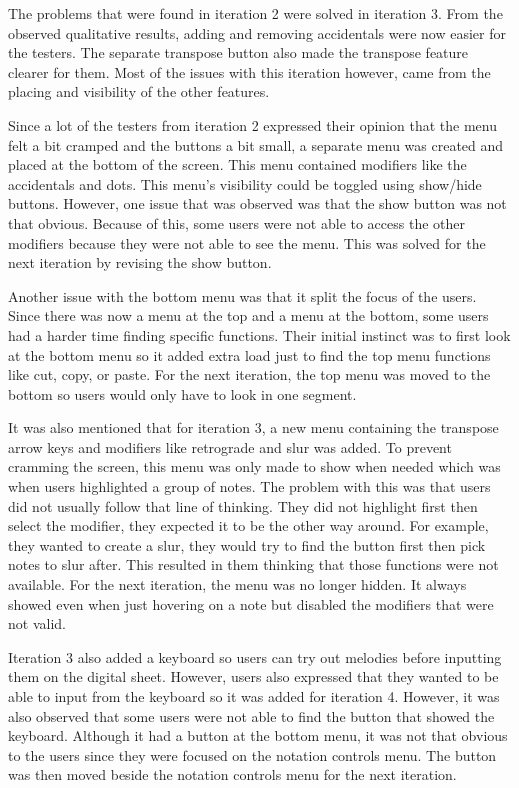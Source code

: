 			The problems that were found in iteration 2 were solved in iteration 3. From the observed qualitative results, adding and removing accidentals were now easier for the testers. The separate transpose button also made the transpose feature clearer for them. Most of the issues with this iteration however, came from the placing and visibility of the other features. 

			Since a lot of the testers from iteration 2 expressed their opinion that the menu felt a bit cramped and the buttons a bit small, a separate menu was created and placed at the bottom of the screen. This menu contained modifiers like the accidentals and dots. This menu's visibility could be toggled using show/hide buttons. However, one issue that was observed was that the show button was not that obvious. Because of this, some users were not able to access the other modifiers because they were not able to see the menu. This was solved for the next iteration by revising the show button. 

			Another issue with the bottom menu was that it split the focus of the users. Since there was now a menu at the top and a menu at the bottom, some users had a harder time finding specific functions. Their initial instinct was to first look at the bottom menu so it added extra load just to find the top menu functions like cut, copy, or paste. For the next iteration, the top menu was moved to the bottom so users would only have to look in one segment. 

			It was also mentioned that for iteration 3, a new menu containing the transpose arrow keys and modifiers like retrograde and slur was added. To prevent cramming the screen, this menu was only made to show when needed which was when users highlighted a group of notes. The problem with this was that users did not usually follow that line of thinking. They did not highlight first then select the modifier, they expected it to be the other way around. For example, they wanted to create a slur, they would try to find the button first then pick notes to slur after. This resulted in them thinking that those functions were not available. For the next iteration, the menu was no longer hidden. It always showed even when just hovering on a note but disabled the modifiers that were not valid. 

			Iteration 3 also added a keyboard so users can try out melodies before inputting them on the digital sheet. However, users also expressed that they wanted to be able to input from the keyboard so it was added for iteration 4. However, it was also observed that some users were not able to find the button that showed the keyboard. Although it had a button at the bottom menu, it was not that obvious to the users since they were focused on the notation controls menu. The button was then moved beside the notation controls menu for the next iteration. 

